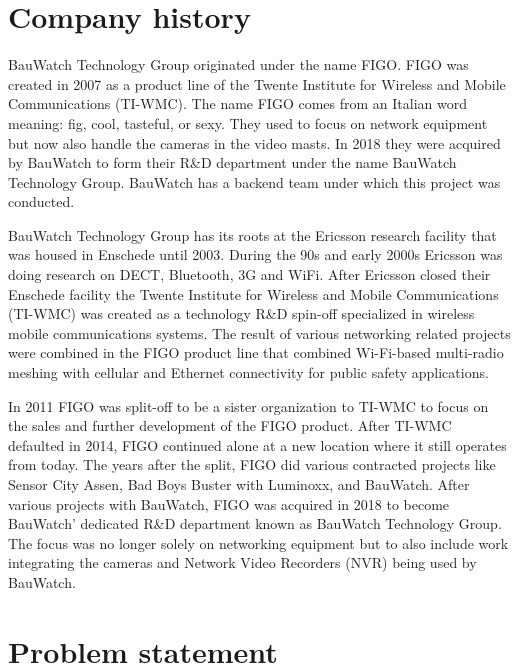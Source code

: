 \section{Company history}
BauWatch Technology Group originated under the name FIGO. FIGO was created in 2007 as a product line of the Twente Institute for Wireless and Mobile Communications (TI-WMC). The name FIGO comes from an Italian word meaning:
fig, cool, tasteful, or sexy.
They used to focus on network equipment but now also handle the cameras in the video masts.
In 2018 they were acquired by BauWatch to form their R\&D department under the name BauWatch Technology Group.
BauWatch has a backend team under which this project was conducted.

BauWatch Technology Group has its roots at the Ericsson research facility that was housed in Enschede until 2003. During the 90s and early 2000s Ericsson was doing
research on DECT, Bluetooth, 3G and WiFi. After Ericsson closed their Enschede facility the Twente Institute for Wireless and Mobile Communications (TI-WMC) was created as a technology R\&D spin-off specialized in wireless mobile communications systems. The result of various networking related projects were combined in the FIGO product line that combined Wi-Fi-based multi-radio meshing with cellular and Ethernet connectivity for public safety applications. \cite{noauthor_twente_nodate}

In 2011 FIGO was split-off to be a sister organization to TI-WMC to focus on the sales and further development of the FIGO product.
After TI-WMC defaulted in 2014, FIGO continued alone at a new location where it still operates from today. 
The years after the split, FIGO did various contracted projects like Sensor City Assen, Bad Boys Buster with Luminoxx, and BauWatch.
After various projects with BauWatch, FIGO was acquired in 2018 to become BauWatch' dedicated R\&D department known as BauWatch Technology Group.
The focus was no longer solely on networking equipment but to also include work integrating the cameras and Network Video Recorders (NVR) being used by BauWatch.

\section{Problem statement}

